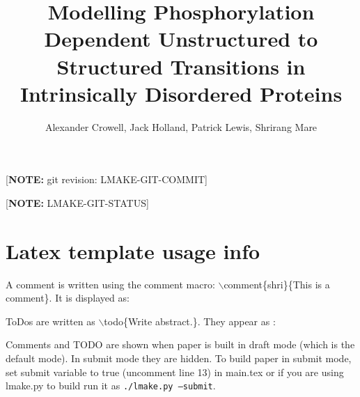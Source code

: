 \documentclass[twocolumn]{article}     %
\newcommand{\comment}[2]{\relax}
\newcommand{\todo}[1]{\relax}
\newcommand{\comment}[2]{\textcolor{commentcolor}{(#2 \emph{--#1})}}
\newcommand{\todo}[1]{\textcolor{commentcolor}{(TODO: #1)}}
\begin{document}
\title{Modelling Phosphorylation Dependent Unstructured to Structured Transitions in Intrinsically Disordered Proteins}

\author{Alexander Crowell, Jack Holland, Patrick Lewis, Shrirang Mare}


\date{}

\maketitle

\ifsubmit
{}

[\textbf{NOTE:} git revision: LMAKE-GIT-COMMIT]

[\textbf{NOTE:} LMAKE-GIT-STATUS]

\fi



\ifsubmit
\else

\section*{Latex template usage info}

A comment is written using the comment macro: $\backslash$comment\{shri\}\{This is a comment\}. It is displayed as:

\comment{shri}{This is a comment}


ToDos are written as $\backslash$todo\{Write abstract.\}. They appear as :

\todo{Write abstract.}

Comments and TODO are shown when paper is built in draft mode (which is the default mode). In submit mode they are hidden. To build paper in submit mode, set submit variable to true (uncomment line 13) in main.tex or if you are using lmake.py to build run it as \texttt{./lmake.py --submit}.
\fi










\end{document}
